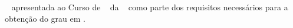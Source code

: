 
%    


\begin{folhadeaprovacao}


\begin{center}
     {\large \imprimirautor}\\
       	\vspace{2cm}	
    \begin{DoubleSpace}    
    {\large \textbf{\MakeUppercase{\imprimirtitulo}}} \\
    {\large \textbf{\MakeUppercase{\imprimirsubtitulo}}}
    \end{DoubleSpace}
		\vspace{1cm}
        
\end{center}		


\begin{flushright} 
    \parbox{0.6\linewidth}{
		\imprimirtipotrabalho~ apresentada ao Curso de \imprimircurso~ da \imprimirinstituicao~ como parte dos
		requisitos necessários para a obtenção do grau em \imprimirgrau.\\}
   \end{flushright} 


\end{folhadeaprovacao}

